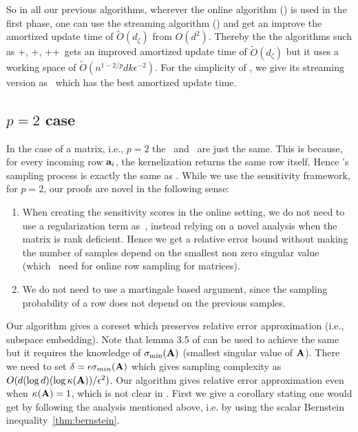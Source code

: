 % 
So in all our previous algorithms, wherever the online algorithm (\online) is used in the first phase, one can use the streaming algorithm (\mrlf) and get an improve the amortized update time of $\tilde{O}(d_{\zeta})$ from $O(d^{2})$. Thereby the the algorithms such as \mrlf+\mrlw, \mrlf+, \mrlf+\mrlw+~gets an improved amortized update time of $\tilde{O}(d_{\zeta})$ but it uses a working space of $\tilde{O}(n^{1-2/p}dk\epsilon^{-2})$. For the simplicity of \online, we give its streaming version as \mrlf~which has the best amortized update time.
% 
\subsection{$p=2$ case}
In the case of a matrix, i.e., $p=2$ the \online~and ~are just the same. This is because, for every incoming row $\mathbf{a}_{i}$, the kernelization returns the same row itself. Hence 's sampling process is exactly the same as \online. While we use the sensitivity framework, for $p=2$, our proofs are novel in the following sense:
\begin{enumerate}
 \item When creating the sensitivity scores in the online setting, we do not need
 to use a regularization term as~\cite{cohen2016online}, instead relying on a novel analysis when the matrix is rank deficient. Hence we get a relative error bound without making the number of samples depend on the smallest non zero singular value (which~\cite{cohen2016online} need for online row sampling for matrices).
 \item We do not need to use a martingale based argument, since the sampling probability of a row does not depend on the previous samples.
\end{enumerate}
Our algorithm gives a coreset which preserves relative error approximation (i.e., subspace embedding). Note that lemma 3.5 of \cite{cohen2016online} can be used to achieve the same but it requires the knowledge of $\sigma_{\min}(\mathbf{A})$ (smallest singular value of $\mathbf{A}$). There we need to set $\delta = \epsilon\sigma_{min}(\mathbf{A})$ which gives sampling complexity as $O(d(\log d)(\log \kappa(\mathbf{A}))/\epsilon^{2})$. Our algorithm gives relative error approximation even when $\kappa(\mathbf{A}) = 1$, which is not clear in \cite{cohen2016online}. 
First we give a corollary stating one would get by following the analysis mentioned above, i.e. by using the scalar Bernstein inequality~\ref{thm:bernstein}.
